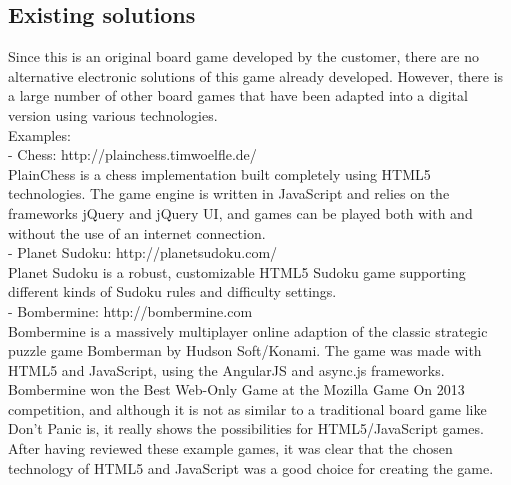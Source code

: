\subsection{Existing solutions}
Since this is an original board game developed by the customer, there are no alternative electronic solutions of this game already developed. However, there is a large number of other board games that have been adapted into a digital version using various technologies.\\

Examples:\\
- Chess: http://plainchess.timwoelfle.de/\\
PlainChess is a chess implementation built completely using HTML5 technologies. The game engine is written in JavaScript and relies on the frameworks jQuery and jQuery UI, and games can be played both with and without the use of an internet connection.\\

- Planet Sudoku: http://planetsudoku.com/\\
Planet Sudoku is a robust, customizable HTML5 Sudoku game supporting different kinds of Sudoku rules and difficulty settings.\\

- Bombermine: http://bombermine.com\\
Bombermine is a massively multiplayer online adaption of the classic strategic puzzle game Bomberman by Hudson Soft/Konami. The game was made with HTML5 and JavaScript, using the AngularJS and async.js frameworks. Bombermine won the Best Web-Only Game at the Mozilla Game On 2013 competition, and although it is not as similar to a traditional board game like Don’t Panic is, it really shows the possibilities for HTML5/JavaScript games.\\

After having reviewed these example games, it was clear that the chosen technology of HTML5 and JavaScript was a good choice for creating the game.\\

